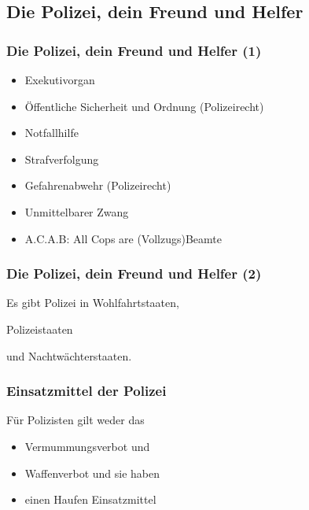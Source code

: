 \documentclass[]{beamer}
\begin{document}
	\begin{frame}
	\subsection{Die Polizei, dein Freund und Helfer}
	\frametitle{Die Polizei, dein Freund und Helfer (1)}
	\begin{itemize}
		\item Exekutivorgan
		\item Öffentliche Sicherheit und Ordnung (Polizeirecht)
		\item Notfallhilfe
		\item Strafverfolgung
		\item Gefahrenabwehr (Polizeirecht)
		\item Unmittelbarer Zwang
		\item A.C.A.B: All Cops are (Vollzugs)Beamte
	\end{itemize}
	\end{frame}

	\begin{frame}
	\frametitle{Die Polizei, dein Freund und Helfer (2)}
	Es gibt Polizei in Wohlfahrtstaaten,\par
	Polizeistaaten\par
	und Nachtwächterstaaten.
	\end{frame}

	\begin{frame}
	\frametitle{Einsatzmittel der Polizei}
	Für Polizisten gilt weder das 
	\begin{itemize}
		\item Vermummungsverbot und
		\item Waffenverbot und sie haben
		\item einen Haufen Einsatzmittel
	\end{itemize}
	\end{frame}
\end{document}
